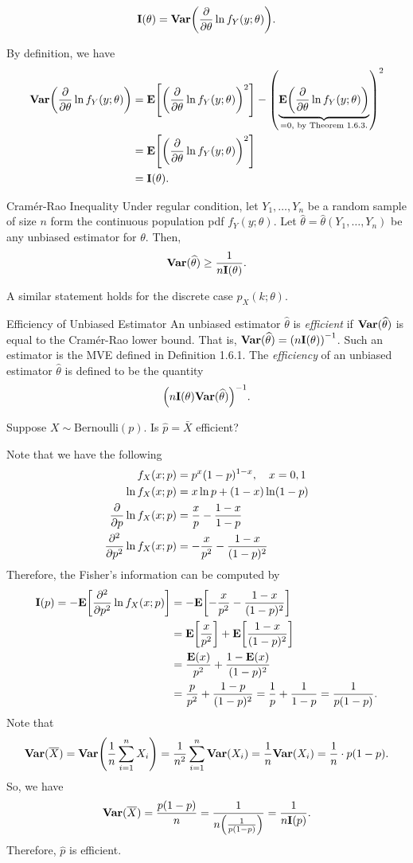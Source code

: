 \begin{cor}{}
	\[\vb{I}(\theta)=\vb{Var}\qty(\pdv{\theta}\ln f_Y(y;\theta)).\]
\end{cor}
\begin{prf}
	By definition, we have \begin{align*}
		\vb{Var}\qty(\pdv{\theta}\ln f_Y(y;\theta))&=\vb{E}\qty[\qty(\pdv{\theta}\ln f_Y(y;\theta))^2]-\qty(\underbrace{\vb{E}\qty(\pdv{\theta}\ln f_Y(y;\theta))}_{=0,\text{ by Theorem 1.6.3.}})^2\\&=\vb{E}\qty[\qty(\pdv{\theta}\ln f_Y(y;\theta))^2]\\&=\vb{I}(\theta).
	\end{align*}
\end{prf}
\begin{thm}{Cramér-Rao Inequality}
	Under regular condition, let $Y_1,\dots,Y_n$ be a random sample of size $n$ form the continuous population pdf $f_Y(y;\theta)$. Let $\hat\theta=\hat\theta(Y_1,\dots,Y_n)$ be any unbiased estimator for $\theta$. Then, \[\vb{Var}(\widehat\theta)\geq\dfrac{1}{n\vb{I}(\theta)}.\]
\end{thm}
\begin{rmk} A similar statement holds for the discrete case $p_X(k;\theta)$. \end{rmk}
\begin{df}{Efficiency of Unbiased Estimator}
	An unbiased estimator $\hat\theta$ is \textit{efficient} if $\vb{Var}(\widehat\theta)$ is equal to the Cramér-Rao lower bound. That is, $\vb{Var}(\widehat\theta)=\qty(n\vb{I}(\theta))^{-1}$. Such an estimator is the MVE defined in Definition 1.6.1. The \textit{efficiency} of an unbiased estimator $\hat\theta$ is defined to be the quantity \[\qty(n\vb{I}(\theta)\vb{Var}(\widehat\theta))^{-1}.\]
\end{df}
\begin{eg}
	Suppose $X\sim\text{Bernoulli}(p)$. Is $\hat p=\bar X$ efficient? 
	\begin{sol}
		Note that we have the following\begin{align*}
			f_X(x;p)&=p^x(1-p)^{1-x},\quad x=0,1\\\ln f_X(x;p)&=x\ln p+(1-x)\ln(1-p)\\\pdv{p}\ln f_X(x;p)&=\dfrac{x}{p}-\dfrac{1-x}{1-p}\\\pdv[2]{p}\ln f_X(x;p)&=-\dfrac{x}{p^2}-\dfrac{1-x}{(1-p)^2}\end{align*} 
		Therefore, the Fisher's information can be computed by \begin{align*}\vb{I}(p)=-\vb{E}\qty[\pdv[2]{p}\ln f_X(x;p)]&=-\vb{E}\qty[-\dfrac{x}{p^2}-\dfrac{1-x}{(1-p)^2}]\\&=\vb{E}\qty[\dfrac{x}{p^2}]+\vb{E}\qty[\dfrac{1-x}{(1-p)^2}]\\&=\dfrac{\vb{E}(x)}{p^2}+\dfrac{1-\vb{E}(x)}{(1-p)^2}\\&=\dfrac{p}{p^2}+\dfrac{1-p}{(1-p)^2}=\dfrac{1}{p}+\dfrac{1}{1-p}=\dfrac{1}{p(1-p)}.\end{align*} 
		Note that \[\vb{Var}(\overline X)=\vb{Var}\qty(\dfrac{1}{n}\sum_{i=1}^nX_i)=\dfrac{1}{n^2}\sum_{i=1}^n\vb{Var}(X_i)=\dfrac{1}{n}\vb{Var}(X_i)=\dfrac{1}{n}\cdot p(1-p).\] So, we have \[\vb{Var}(\overline X)=\dfrac{p(1-p)}{n}=\dfrac{1}{n\qty(\frac{1}{p(1-p)})}=\dfrac{1}{n\vb{I}(p)}.\] Therefore, $\hat p$ is efficient. 
	\end{sol}
\end{eg}
